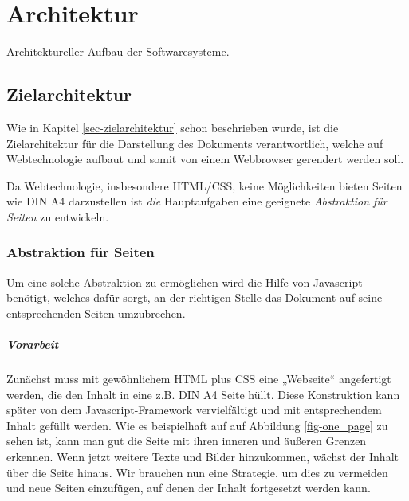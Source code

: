 \chapter{Architektur}

Architektureller Aufbau der Softwaresysteme.

\section{Zielarchitektur}

Wie in Kapitel \ref{sec-zielarchitektur} schon beschrieben wurde, ist die
Zielarchitektur für die Darstellung des Dokuments verantwortlich, welche
auf Webtechnologie aufbaut und somit von einem Webbrowser gerendert werden
soll.

Da Webtechnologie, insbesondere HTML/CSS, keine Möglichkeiten bieten
Seiten wie DIN A4 darzustellen ist \emph{die} Hauptaufgaben eine geeignete
\emph{Abstraktion für Seiten} zu entwickeln.


\subsection{Abstraktion für Seiten}

Um eine solche Abstraktion zu ermöglichen wird die Hilfe von Javascript
benötigt, welches dafür sorgt, an der richtigen Stelle das Dokument auf
seine entsprechenden Seiten umzubrechen.

\paragraph{Vorarbeit}
Zunächst muss mit gewöhnlichem HTML plus CSS eine „Webseite“ angefertigt
werden, die den Inhalt in eine z.B. DIN A4 Seite hüllt. Diese Konstruktion
kann später von dem Javascript-Framework vervielfältigt und mit entsprechendem
Inhalt gefüllt werden. Wie es beispielhaft auf auf Abbildung
\ref{fig-one_page} zu sehen ist,
kann man gut die Seite mit ihren inneren und äußeren
Grenzen erkennen. Wenn jetzt weitere Texte und Bilder
hinzukommen, wächst der Inhalt über die Seite hinaus. Wir brauchen nun
eine Strategie, um dies zu vermeiden und neue Seiten einzufügen, auf denen
der Inhalt fortgesetzt werden kann.

